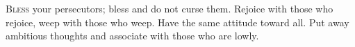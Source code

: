
\lettrine{B}{less} your persecutors; bless and do not curse them. Rejoice with those who rejoice, weep with those who weep. Have the same attitude toward all. Put away ambitious thoughts and associate with those who are lowly.